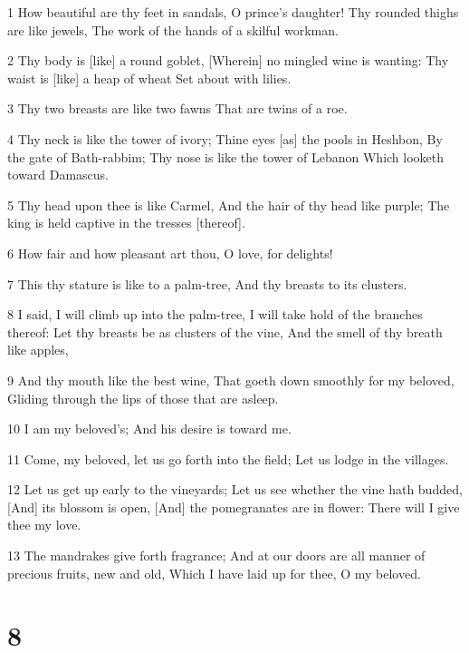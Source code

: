 \par 1 How beautiful are thy feet in sandals, O prince's daughter! Thy rounded thighs are like jewels, The work of the hands of a skilful workman.
\par 2 Thy body is [like] a round goblet, [Wherein] no mingled wine is wanting: Thy waist is [like] a heap of wheat Set about with lilies.
\par 3 Thy two breasts are like two fawns That are twins of a roe.
\par 4 Thy neck is like the tower of ivory; Thine eyes [as] the pools in Heshbon, By the gate of Bath-rabbim; Thy nose is like the tower of Lebanon Which looketh toward Damascus.
\par 5 Thy head upon thee is like Carmel, And the hair of thy head like purple; The king is held captive in the tresses [thereof].
\par 6 How fair and how pleasant art thou, O love, for delights!
\par 7 This thy stature is like to a palm-tree, And thy breasts to its clusters.
\par 8 I said, I will climb up into the palm-tree, I will take hold of the branches thereof: Let thy breasts be as clusters of the vine, And the smell of thy breath like apples,
\par 9 And thy mouth like the best wine, That goeth down smoothly for my beloved, Gliding through the lips of those that are asleep.
\par 10 I am my beloved's; And his desire is toward me.
\par 11 Come, my beloved, let us go forth into the field; Let us lodge in the villages.
\par 12 Let us get up early to the vineyards; Let us see whether the vine hath budded, [And] its blossom is open, [And] the pomegranates are in flower: There will I give thee my love.
\par 13 The mandrakes give forth fragrance; And at our doors are all manner of precious fruits, new and old, Which I have laid up for thee, O my beloved.

\chapter{8}

